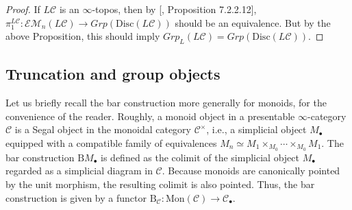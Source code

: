 \begin{proof}
    If $L\mathcal{C}$ is an $\infty$-topos, then by [\cite{lurie2009higher}, Proposition 7.2.2.12], $\pi_1^{L\mathcal{C}}:\mathcal{EM}_n(L\mathcal{C})\to Grp(\mathrm{Disc}(L\mathcal{C}))$ should be an equivalence. But by the above Proposition, this should imply $Grp_L(L\mathcal{C})=Grp(\mathrm{Disc}(L\mathcal{C}))$.
\end{proof}

\subsection{Truncation and group objects}

 Let us briefly recall the bar construction more generally for monoids, for the convenience of the reader. Roughly, a monoid object in a presentable $\infty$-category $\mathcal{C}$ is a Segal object in the monoidal category $\mathcal{C}^\times$, i.e., a simplicial object $M_\bullet$ equipped with a compatible family of equivalences $M_n\simeq M_1\times_{M_0}\cdots \times _{M_0}M_1$. The bar construction $\mathrm{B}M_\bullet$ is defined as the colimit of the simplicial object $M_\bullet$ regarded as a simplicial diagram in $\mathcal{C}$. Because monoids are canonically pointed by the unit morphism, the resulting colimit is also pointed. Thus, the bar construction is given by a functor $\mathrm{B}_\mathcal{C}:\mathrm{Mon}(\mathcal{C})\to \mathcal{C}_\bullet$. 
 
